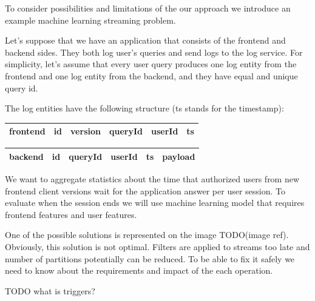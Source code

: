 To consider possibilities and limitations of the our approach we introduce an example machine learning streaming problem.

Let's suppose that we have an application that consists of the frontend and backend sides.
They both log user's queries and send logs to the log service.
For simplicity, let's assume that every user query produces one log entity from the frontend and one log entity from the backend, and they have equal and unique query id.

The log entities have the following structure (ts stands for the timestamp):

\begin{tabular}{|l|lllll|}
    \hline
    \textbf{frontend} & id & version & queryId & userId & ts \\
    \hline
\end{tabular}

\vspace{0.1em}

\begin{tabular}{|l|lllll|}
    \hline
    \textbf{backend} & id & queryId & userId & ts & payload \\
    \hline
\end{tabular}

We want to aggregate statistics about the time that authorized users from new frontend client versions wait for the application answer per user session.
To evaluate when the session ends we will use machine learning model that requires frontend features and user features.

One of the possible solutions is represented on the image TODO(image ref).
Obviously, this solution is not optimal.
Filters are applied to streams too late and number of partitions potentially can be reduced.
To be able to fix it safely we need to know about the requirements and impact of the each operation.

TODO what is triggers? \\


